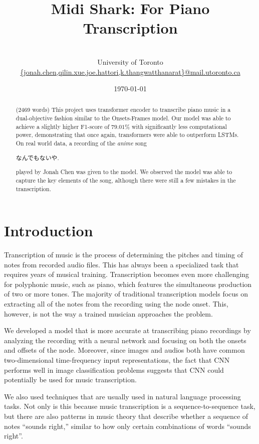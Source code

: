 \documentclass[a4paper,twocolumn,10pt]{article}
\title{\vspace{-50pt}\bfseries{\Large{Midi Shark: For Piano Transcription}}}
\author{\normalfont{Jonah Chen, QiLin Xue, Joe Hattori, Khanatat Thangwatthanarat}\\\small{University of Toronto}\\\vspace{-10pt}\small{\url{{jonah.chen,qilin.xue,joe.hattori,k.thangwatthanarat}@mail.utoronto.ca}}}
\date{\today}
\begin{document}
\maketitle
\begin{abstract}
  (2469 words) This project uses transformer encoder to transcribe piano music in a dual-objective fashion similar to the Onsets-Frames model\cite{onsets_and_frames}. Our model was able to achieve a slightly higher F1-score of \(79.01\%\) with significantly less computational power, demonstrating that once again, transformers were able to outperform LSTMs. On real world data, a recording of the \textit{anime} song \begin{CJK}{UTF8}{min}なんでもないや.\end{CJK} played by Jonah Chen was given to the model. We observed the model was able to capture the key elements of the song, although there were still a few mistakes in the transcription.
\end{abstract}

\section{Introduction}
Transcription of music is the process of determining the pitches and timing of notes from recorded audio files. This has always been a specialized task that requires years of musical training. Transcription becomes even more challenging for polyphonic music, such as piano, which features the simultaneous production of two or more tones. The majority of traditional transcription models focus on extracting all of the notes from the recording using the node onset. This, however, is not the way a trained musician approaches the problem\cite{intro}.

We developed a model that is more accurate at transcribing piano recordings by analyzing the recording with a neural network and focusing on both the onsets and offsets of the node. Moreover, since images and audios both have common two-dimensional time-frequency input representations, the fact that CNN performs well in image classification problems suggests that CNN could potentially be used for music transcription\cite{onsets_and_frames}.

We also used techniques that are usually used in natural language processing tasks. Not only is this because music transcription is a sequence-to-sequence task, but there are also patterns in music theory that describe whether a sequence of notes ``sounds right,'' similar to how only certain combinations of words ``sounds right''\cite{onsets_and_frames}. 
\end{document}
